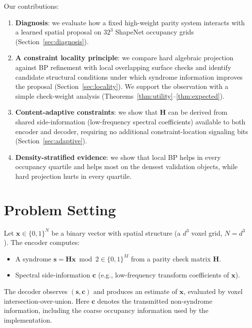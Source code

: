 \documentclass[11pt,a4paper]{article}
\begin{document}
Our contributions:
\begin{enumerate}[nosep]
  \item \textbf{Diagnosis}: we evaluate how a fixed high-weight parity
    system interacts with a learned spatial proposal on $32^3$ ShapeNet
    occupancy grids (Section~\ref{sec:diagnosis}).
  \item \textbf{A constraint locality principle}: we compare hard
    algebraic projection against BP refinement with local overlapping
    surface checks and identify candidate structural conditions under which
    syndrome information improves the proposal (Section~\ref{sec:locality}).
    We support the observation with a simple check-weight analysis
    (Theorems~\ref{thm:utility}--\ref{thm:expected}).
  \item \textbf{Content-adaptive constraints}: we show that
    $\mathbf{H}$ can be derived from shared side-information
    (low-frequency spectral coefficients) available to both encoder and decoder,
    requiring no additional constraint-location signaling bits
    (Section~\ref{sec:adaptive}).
  \item \textbf{Density-stratified evidence}: we show that local BP helps
    in every occupancy quartile and helps most on the densest validation
    objects, while hard projection hurts in every quartile.
\end{enumerate}

\section{Problem Setting}

Let $\mathbf{x} \in \{0,1\}^N$ be a binary vector with spatial
structure (a $d^3$ voxel grid, $N = d^3$). The encoder computes:
\begin{itemize}[nosep]
  \item A syndrome $\mathbf{s} = \mathbf{H}\mathbf{x} \bmod 2 \in
    \{0,1\}^M$ from a parity check matrix $\mathbf{H}$.
  \item Spectral side-information $\mathbf{c}$ (e.g., low-frequency
    transform coefficients of $\mathbf{x}$).
\end{itemize}
The decoder observes $(\mathbf{s},\mathbf{c})$ and produces an
estimate of $\mathbf{x}$, evaluated by voxel intersection-over-union.
Here $\mathbf{c}$ denotes the transmitted non-syndrome information,
including the coarse occupancy information used by the implementation.
\end{document}
